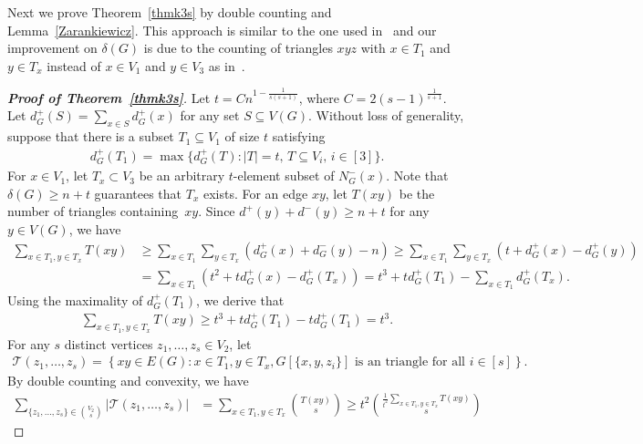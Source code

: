 \documentclass[11pt]{article}
\numberwithin{equation}{section}
\begin{document}
	
	Next we prove Theorem~\ref{thmk3s} by double counting and Lemma~\ref{Zarankiewicz}. This approach is similar to the one used in~\cite{bhalkikar2023subgraphs, bollobas1975complete} and our improvement on $\delta(G)$ is due to the counting of  triangles $xyz$ with $x\in T_1$ and $y\in T_x$ instead of $x\in V_1$ and $y\in V_3$ as in~\cite{bhalkikar2023subgraphs, bollobas1975complete}.
	
	\begin{proof}[\textbf{Proof of Theorem~\ref{thmk3s}}]
		Let $t=Cn^{1-\frac{1}{s(s+1)}}$, where $C= 2 (s-1)^{\frac1{s+1}}$. 
		Let $d_G^+(S)= \sum_{x\in S} d^+_G(x)$ for any set $S\subseteq V(G)$.
		Without loss of generality, suppose that there is a subset $T_1\subseteq V_1$ of size $t$ satisfying 
		\begin{align*}
			d_G^+(T_1) = \max \{ d_G^+(T) \colon \text{$|T|= t$, $T\subseteq V_i$, $i\in [3]$}  \}. 
		\end{align*}
		For $x\in V_1$, let $T_x\subset V_3$ be an arbitrary $t$-element subset of $N_G^-(x)$. 
		Note that $\delta(G)\ge n+t$ guarantees that $T_x$ exists.
		For an edge $xy$, let $T(xy)$ be the number of triangles containing~$xy$. 
		Since $d^+(y) + d^-(y) \ge n+ t$ for any $y\in V(G)$, we have 
		\begin{align*}
			\sum\limits_{x\in T_1,y\in T_x} T (xy) & \geq \sum\limits_{x\in T_1}\sum\limits_{y\in T_x}\left(d_G^+(x)+d_G^-(y)-n\right)
			\geq \sum\limits_{x\in T_1}\sum\limits_{y\in T_x}\left(t+d_G^+(x)-d_G^+(y)\right)\\
			&= \sum\limits_{x\in T_1}\left(t^2+td_G^+(x)-  	d_G^+(T_x) \right)
			= t^3 + t d^+_G(T_1) -  \sum\limits_{x\in T_1} d_G^+(T_x) .
		\end{align*}
		Using the maximality of $d_G^+(T_1)$, we derive that		
		\begin{align*}
			\sum\limits_{x\in T_1,y\in T_x} T (xy) 
			\ge  t^3+t d_G^+(T_1) -t d_G^+(T_1)
			=t^3.
		\end{align*}
		For any $s$ distinct vertices $z_1,\dots,z_s\in V_2$, let 
		\begin{align*}
			\mathcal{T}(z_1,\dots,z_s) = \left\{ xy\in E(G): x\in T_1,y\in T_x, G[\{x, y, z_i\}] \text{ is an triangle for all } i\in [s] \right\}.
		\end{align*}		
		By double counting and convexity, we have
		\begin{align*}
			\sum\limits_{\{z_1,\dots,z_s\}\in\binom{V_2}{s}} |\mathcal{T}(z_1,\dots,z_s)|&= \sum\limits_{x\in T_1,y\in T_x}\binom{T(xy)}{s}
			\geq t^2\binom{ \frac{1}{t^2}{\sum\limits_{x\in T_1,y\in T_x}T(xy)}}{s}

\end{align*}
\end{proof}
\end{document}
